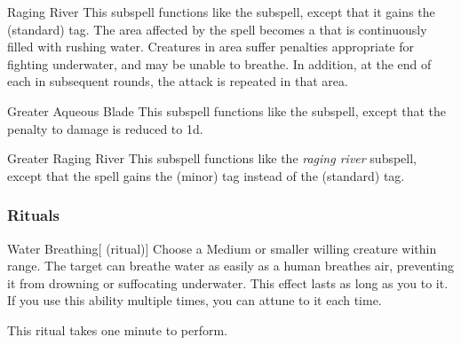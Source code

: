 \begin{ability}[\nth{3}]{Raging River}
This subspell functions like the  subspell, except that it gains the  (standard) tag.
The area affected by the spell becomes a  that is continuously filled with rushing water.
Creatures in area suffer penalties appropriate for fighting underwater, and may be unable to breathe.
In addition, at the end of each  in subsequent rounds, the attack is repeated in that area.
\end{ability}
\vspace{0.25em}



\begin{ability}[\nth{5}]{Greater Aqueous Blade}
This subspell functions like the  subspell, except that the penalty to damage is reduced to \minus1d.
\end{ability}
\vspace{0.25em}



\begin{ability}[\nth{6}]{Greater Raging River}
This subspell functions like the \textit{raging river} subspell, except that the spell gains the  (minor) tag instead of the  (standard) tag.
\end{ability}
\vspace{0.25em}



\subsubsection{Rituals}


\begin{ability}[\nth{2}]{Water Breathing}[ (ritual)]
Choose a Medium or smaller willing creature within \rngclose range.
The target can breathe water as easily as a human breathes air, preventing it from drowning or suffocating underwater.
This effect lasts as long as you  to it.
If you use this ability multiple times, you can attune to it each time.

This ritual takes one minute to perform.
\end{ability}
\vspace{0.25em}


